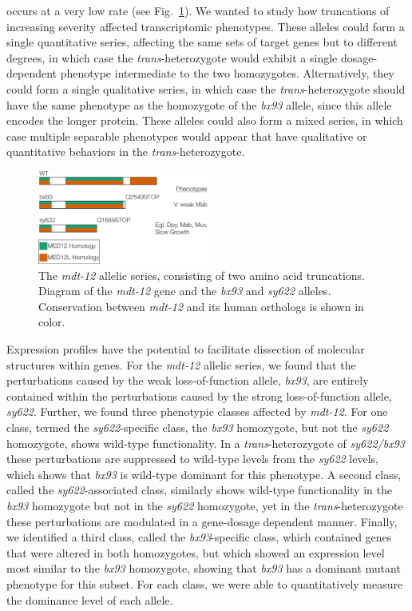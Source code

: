 \documentclass[10pt, twocolumn]{article}
\newcommand{\gene}[1]{\mbox{\emph{#1}}}
\newcommand{\dpy}{\gene{mdt-12}}
\begin{document}
occurs at a very low rate (see Fig.~\ref{fig:dpy22}). We wanted to study how
truncations of increasing severity affected transcriptomic phenotypes. These
alleles could form a single quantitative series, affecting the same sets of
target genes but to different degrees, in which case the
\emph{trans}-heterozygote would exhibit a single dosage-dependent phenotype
intermediate to the two homozygotes. Alternatively, they could form a single
qualitative series, in which case the \emph{trans}-heterozygote should have the
same phenotype as the homozygote of the \emph{bx93} allele, since this allele
encodes the longer protein. These alleles could also form a mixed series, in
which case multiple separable phenotypes would appear that have qualitative or
quantitative behaviors in the \emph{trans}-heterozygote.

\begin{figure}
  \centering{}
  \includegraphics[width=0.5\textwidth]{../figs/gene_model_dpy22.pdf}
  \caption{
    The \dpy{} allelic series, consisting of two amino acid truncations. Diagram
    of the \dpy{} gene and the \emph{bx93} and \emph{sy622} alleles.
    Conservation between \dpy{} and its human orthologs is shown in color.
    }
\label{fig:dpy22}
\end{figure}

Expression profiles have the potential to facilitate dissection of molecular
structures within genes. For the \dpy{} allelic series, we found that the
perturbations caused by the weak loss-of-function allele, \emph{bx93}, are
entirely contained within the perturbations caused by the strong
loss-of-function allele, \emph{sy622}. Further, we found three phenotypic
classes affected by \dpy{}. For one class, termed the \emph{sy622}-specific
class, the \emph{bx93} homozygote, but not the \emph{sy622} homozygote, shows
wild-type functionality. In a \emph{trans}-heterozygote of \emph{sy622/bx93}
these perturbations are suppressed to wild-type levels from the \emph{sy622}
levels, which shows that \emph{bx93} is wild-type dominant for this phenotype. A
second class, called the \emph{sy622}-associated class, similarly shows
wild-type functionality in the \emph{bx93} homozygote but not in the
\emph{sy622} homozygote, yet in the \emph{trans}-heterozygote these
perturbations are modulated in a gene-dosage dependent manner. Finally, we
identified a third class, called the \emph{bx93}-specific class, which contained
genes that were altered in both homozygotes, but which showed an expression
level most similar to the \emph{bx93} homozygote, showing that \emph{bx93} has a
dominant mutant phenotype for this subset. For each class, we were able to
quantitatively measure the dominance level of each allele.
\end{document}
